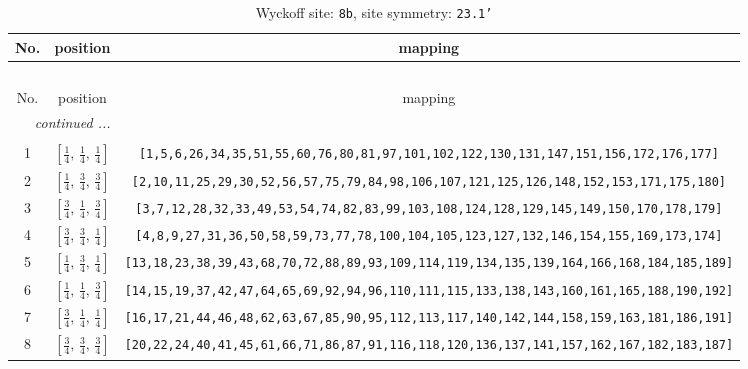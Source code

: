 \documentclass[fleqn,8pt]{jsarticle}
\begin{document}
\renewcommand{\arraystretch}{1.2}
\begin{longtable}{ccc}
\caption{Wyckoff site: {\tt 8b}, site symmetry: {\tt 23.1'}}
 \\
 \hline \hline
No. & position & mapping \\ \hline \endfirsthead

\multicolumn{2}{l}{\tablename\ \thetable{}} \\
 \hline \hline
No. & position & mapping \\ \hline \endhead

 \hline \hline
\multicolumn{2}{r}{\footnotesize\it continued ...} \\ \endfoot

 \hline \hline
\multicolumn{2}{r}{} \\ \endlastfoot

1 & $\left[ \frac{1}{4},\, \frac{1}{4},\, \frac{1}{4} \right]$ & {\tt [1,5,6,26,34,35,51,55,60,76,80,81,97,101,102,122,130,131,147,151,156,172,176,177]} \\ \hline
2 & $\left[ \frac{1}{4},\, \frac{3}{4},\, \frac{3}{4} \right]$ & {\tt [2,10,11,25,29,30,52,56,57,75,79,84,98,106,107,121,125,126,148,152,153,171,175,180]} \\ \hline
3 & $\left[ \frac{3}{4},\, \frac{1}{4},\, \frac{3}{4} \right]$ & {\tt [3,7,12,28,32,33,49,53,54,74,82,83,99,103,108,124,128,129,145,149,150,170,178,179]} \\ \hline
4 & $\left[ \frac{3}{4},\, \frac{3}{4},\, \frac{1}{4} \right]$ & {\tt [4,8,9,27,31,36,50,58,59,73,77,78,100,104,105,123,127,132,146,154,155,169,173,174]} \\ \hline
5 & $\left[ \frac{1}{4},\, \frac{3}{4},\, \frac{1}{4} \right]$ & {\tt [13,18,23,38,39,43,68,70,72,88,89,93,109,114,119,134,135,139,164,166,168,184,185,189]} \\ \hline
6 & $\left[ \frac{1}{4},\, \frac{1}{4},\, \frac{3}{4} \right]$ & {\tt [14,15,19,37,42,47,64,65,69,92,94,96,110,111,115,133,138,143,160,161,165,188,190,192]} \\ \hline
7 & $\left[ \frac{3}{4},\, \frac{1}{4},\, \frac{1}{4} \right]$ & {\tt [16,17,21,44,46,48,62,63,67,85,90,95,112,113,117,140,142,144,158,159,163,181,186,191]} \\ \hline
8 & $\left[ \frac{3}{4},\, \frac{3}{4},\, \frac{3}{4} \right]$ & {\tt [20,22,24,40,41,45,61,66,71,86,87,91,116,118,120,136,137,141,157,162,167,182,183,187]} \\
\end{longtable}
\renewcommand{\arraystretch}{1.2}
\end{document}
